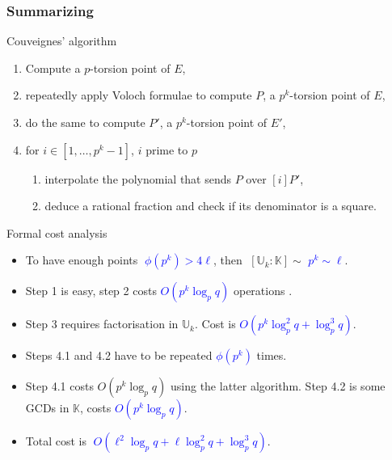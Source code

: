 \documentclass[10pt]{beamer}
\newcommand{\blue}[1]{\textcolor{blue}{#1}}  %
\newcommand{\K}{\mathbb{K}}  %
\newcommand{\U}{\mathbb{U}}  %
\newcommand{\euler}{\phi}  %
\newcommand{\0}{\mathcal{O}}  %
\begin{document}

\begin{frame}
  \frametitle{Summarizing}

  \vspace{-2mm}

  \begin{block}{Couveignes' algorithm}
    \begin{enumerate}
    \item Compute a $p$-torsion point of $E$,
    \item repeatedly apply Voloch formulae to compute $P$, a $p^k$-torsion
      point of $E$,
    \item do the same to compute $P'$, a $p^k$-torsion point
      of $E'$,
    \item for $i \in [1,\dots,p^k-1]$, $i$ prime to $p$
      \begin{enumerate}
      \item interpolate the polynomial that sends $P$ over $[i]P'$,
      \item deduce a rational fraction and check if its denominator is
        a square.
      \end{enumerate}
    \end{enumerate}
  \end{block}

  \vspace{-2mm}

  \begin{block}{Formal cost analysis}
    \begin{itemize}
    \item To have enough points \blue{$\;\euler(p^k) > 4\ell$}, then
      $\;[\U_k:\K] \sim$ \blue{$p^k \sim \ell$}.
    \item Step 1 is easy, step 2 costs \blue{$O(p^k\log_pq)$}
      operations .
    \item Step 3 requires factorisation in $\U_k$. Cost is
      \blue{$O(p^{k}\log_p^2q + \log_p^3q)$}.
    \item Steps 4.1 and 4.2 have to be repeated
      \blue{$\euler(p^k)$} times.
    \item Step 4.1 costs \alert{$O(p^k\log_pq)$} using the latter
      algorithm. Step 4.2 is some GCDs in $\K$, costs
      \blue{$O(p^k\log_pq)$}.
    \item Total cost is \blue{$\;O(\ell^2\log_pq + \ell\log_p^2q + \log_p^3q)$}.
    \end{itemize}
  \end{block}
\end{frame}
\end{document}
